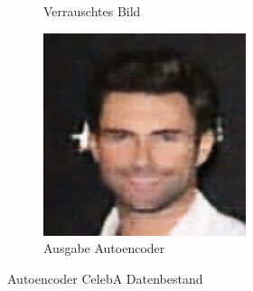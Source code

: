 \begin{figure}[!htb]
\begin{subfigure}[h]{0.3\textwidth}
  \caption{Verrauschtes Bild}
\end{subfigure}
\begin{subfigure}[h]{0.3\textwidth}
  \centering
  \includegraphics[width=\linewidth]{figures/autoencoder_r18/faces_autoencoder3.jpg}
  \caption{Ausgabe Autoencoder}
\end{subfigure}
\caption{Autoencoder CelebA Datenbestand}
\label{fig:autoencoder_celeba}
\end{figure}


